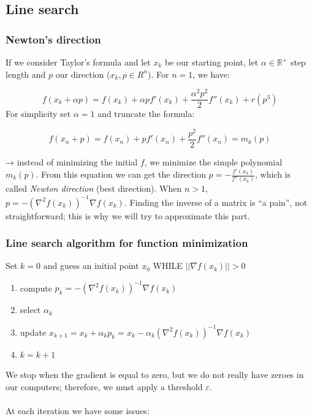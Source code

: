 \subsection{Line search}

\subsubsection{Newton's direction}

If we consider Taylor's formula and let $x_k$ be our starting point, let
$\alpha \in \mathbb{R}^+$ step length and $p$ our direction
($x_k, p \in R^n$). For $n=1$, we have:

$$
f(x_k+\alpha p)=f(x_k) + \alpha p f'(x_k) + \frac{\alpha^2p^2}{2} f''(x_k) + r(p^3)
$$
\noindent
For simplicity set $\alpha=1$ and truncate the formula:

$$
f(x_n+p)=f(x_n) + p f'(x_n) + \frac{p^2}{2} f''(x_n) = m_k(p)
$$

→ instead of minimizing the initial $f$, we minimize the simple
polynomial $m_k(p)$.
\noindent
From this equation we can get the direction
$p = -\frac{f'(x_k)}{f''(x_k)}$, which is called \emph{Newton direction}
(best direction). When $n>1$,
$p = -(\nabla^2 f(x_k))^{-1}\nabla f(x_k)$. Finding the inverse of a
matrix is ``a pain'', not straightforward; this is why we will try to
approximate this part.

\subsubsection{Line search algorithm for function minimization}

Set $k=0$ and guess an initial point $x_0$ WHILE $||\nabla f(x_k)||>0$

\begin{enumerate}
\def\labelenumi{\arabic{enumi}.}
\tightlist
\item
  compute $p_k=-(\nabla^2f(x_k))^{-1}\nabla f(x_k)$
\item
  select $\alpha_k$
\item
  update
  $x_{k+1}=x_k+\alpha_kp_k = x_k -\alpha_k(\nabla^2f(x_k))^{-1}\nabla f(x_k)$
\item
  $k=k+1$
\end{enumerate}
\noindent
We stop when the gradient is equal to zero, but we do not really have
zeroes in our computers; therefore, we must apply a threshold
$\varepsilon$.
\\
\\
\noindent
At each iteration we have some issues:

